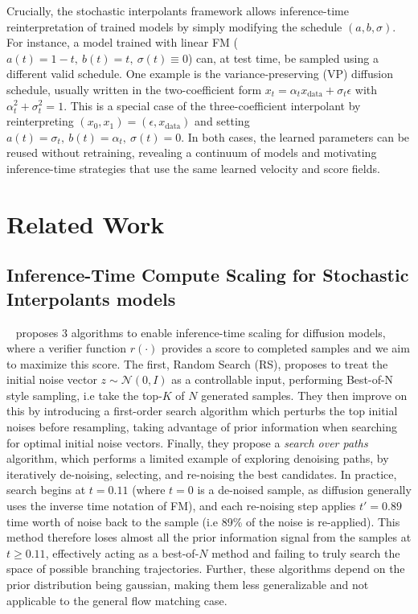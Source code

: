 \documentclass{article} %
\begin{document}
Crucially, the stochastic interpolants framework allows inference-time reinterpretation of trained
models by simply modifying the schedule $(a,b,\sigma)$. For instance, a model trained with linear FM
($a(t)=1-t,\ b(t)=t,\ \sigma(t)\equiv 0$) can, at test time, be sampled using a different valid
schedule. One example is the variance-preserving (VP) diffusion schedule, usually written in the two-coefficient
form $x_t=\alpha_t x_{\mathrm{data}}+\sigma_t \epsilon$ with $\alpha_t^2+\sigma_t^2=1$.
This is a special case of the three-coefficient interpolant by reinterpreting $(x_0,x_1)=(\epsilon,
x_{\mathrm{data}})$ and setting $a(t)=\sigma_t,\ b(t)=\alpha_t,\ \sigma(t)=0$.
In both cases, the learned parameters can be reused without retraining, revealing a continuum of
models and motivating inference-time strategies that use the same learned velocity and score fields.

\section{Related Work}
\label{sec:related}

\subsection{Inference-Time Compute Scaling for Stochastic Interpolants models}
\label{sec:related-fmscaling}

~\cite{ma2025diffits} proposes 3 algorithms to enable inference-time scaling for diffusion models, where a verifier function \( r(\cdot) \) provides a score to completed samples and we aim to maximize this score. The first, Random Search (RS), proposes to treat the initial noise vector \( z \sim \mathcal{N}(0, I) \) as a controllable input, performing Best-of-N style sampling, i.e take the top-$K$ of $N$ generated samples. They then improve on this by introducing a first-order search algorithm which perturbs the top initial noises before resampling, taking advantage of prior information when searching for optimal initial noise vectors. Finally, they propose a \textit{search over paths} algorithm, which performs a limited example of exploring denoising paths, by iteratively de-noising, selecting, and re-noising the best candidates. In practice, search begins at \( t = 0.11 \) (where $t=0$ is a de-noised sample, as diffusion generally uses the inverse time notation of FM), and each re-noising step applies \( t' = 0.89 \) time worth of noise back to the sample (i.e 89\% of the noise is re-applied). This method therefore loses almost all the prior information signal from the samples at \( t \ge 0.11 \), effectively acting as a best-of-\( N \) method and failing to truly search the space of possible branching trajectories. Further, these algorithms depend on the prior distribution being gaussian, making them less generalizable and not applicable to the general flow matching case.
\end{document}
